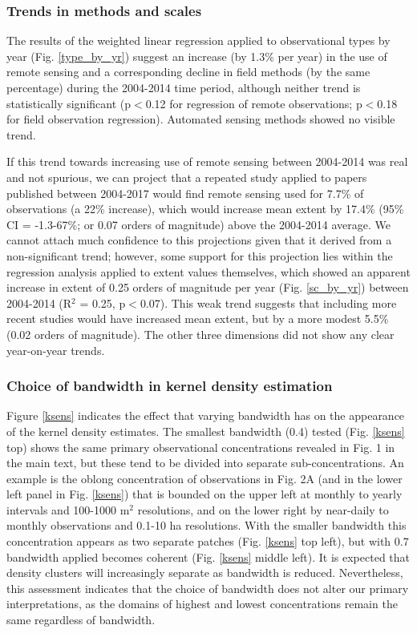 \documentclass[12pt]{article}
\begin{document}
\subsubsection*{Trends in methods and scales}
\vspace{-10pt}
The results of the weighted linear regression applied to observational types by year (Fig. \ref{type_by_yr}) suggest an increase (by 1.3\% per year) in the use of remote sensing and a corresponding decline in field methods (by the same percentage) during the 2004-2014 time period, although neither trend is statistically significant (p$<$0.12 for regression of remote observations; p$<$0.18 for field observation regression).  Automated sensing methods showed no visible trend. 

If this trend towards increasing use of remote sensing between 2004-2014 was real and not spurious, we can project that a repeated study applied to papers published between 2004-2017 would find remote sensing used for 7.7\% of observations (a 22\% increase), which would increase mean extent by 17.4\% (95\% CI = -1.3-67\%;  or 0.07 orders of magnitude) above the 2004-2014 average. We cannot attach much confidence to this projections given that it derived from a non-significant trend; however, some support for this projection lies within the regression analysis applied to extent values themselves, which showed an apparent increase in extent of 0.25 orders of magnitude per year (Fig. \ref{sc_by_yr}) between 2004-2014 (R$^2$ = 0.25, p$<$0.07). This weak trend suggests that including more recent studies would have increased mean extent, but by a more modest 5.5\% (0.02 orders of magnitude).  The other three dimensions did not show any clear year-on-year trends. 

\subsubsection*{Choice of bandwidth in kernel density estimation}
\vspace{-10pt}
Figure \ref{ksens} indicates the effect that varying bandwidth has on the appearance of the kernel density estimates. The smallest bandwidth (0.4) tested (Fig. \ref{ksens} top) shows the same primary observational concentrations revealed in Fig. 1 in the main text, but these tend to be divided into separate sub-concentrations. An example is the oblong concentration of observations in Fig. 2A (and in the lower left panel in Fig. \ref{ksens}) that is bounded on the upper left at monthly to yearly intervals and 100-1000 m$^2$ resolutions, and on the lower right by near-daily to monthly observations and 0.1-10 ha resolutions. With the smaller bandwidth this concentration appears as two separate patches (Fig. \ref{ksens} top left), but with 0.7 bandwidth applied becomes coherent (Fig. \ref{ksens} middle left). It is expected that density clusters will increasingly separate as bandwidth is reduced. Nevertheless, this assessment indicates that the choice of bandwidth does not alter our primary interpretations, as the domains of highest and lowest concentrations remain the same regardless of bandwidth.  
\end{document}
